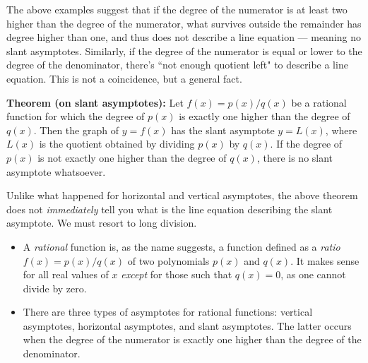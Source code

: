 \documentclass{ximera}
\begin{document}
The above examples suggest that if the degree of the numerator is at least two higher than the degree of the numerator, what survives outside the remainder has degree higher than one, and thus does not describe a line equation --- meaning no slant asymptotes. Similarly, if the degree of the numerator is equal or lower to the degree of the denominator, there's ``not enough quotient left" to describe a line equation. This is not a coincidence, but a general fact.

\begin{callout}
  {\bf Theorem (on slant asymptotes):} Let $f(x) = p(x)/q(x)$ be a rational function for which the degree of $p(x)$ is exactly one higher than the degree of $q(x)$. Then the graph of $y=f(x)$ has the slant asymptote $y=L(x)$, where $L(x)$ is the quotient obtained by dividing $p(x)$ by $q(x)$. If the degree of $p(x)$ is not exactly one higher than the degree of $q(x)$, there is no slant asymptote whatsoever.
\end{callout}

  Unlike what happened for horizontal and vertical asymptotes, the above theorem does not \emph{immediately} tell you what is the line equation describing the slant asymptote. We must resort to long division.


\begin{summary}\begin{itemize}
\item A \emph{rational} function is, as the name suggests, a function defined as a \emph{ratio} $f(x) = p(x)/q(x)$ of two polynomials $p(x)$ and $q(x)$. It makes sense for all real values of $x$ \emph{except} for those such that $q(x) = 0$, as one cannot divide by zero.
\item There are three types of asymptotes for rational functions: vertical asymptotes, horizontal asymptotes, and slant asymptotes. The latter occurs when the degree of the numerator is exactly one higher than the degree of the denominator.
\end{itemize}\end{summary}
\end{document}
